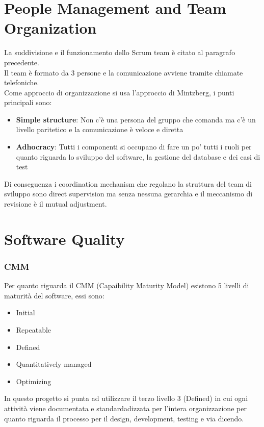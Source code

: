 \documentclass{article}
\begin{document}
\section{People Management and Team Organization}
La suddivisione e il funzionamento dello Scrum team è citato al paragrafo precedente. 
\\Il team è formato da 3 persone e la comunicazione avviene tramite chiamate telefoniche.
\\Come approccio di organizzazione si usa l'approccio di Mintzberg, i punti principali sono:
\begin{itemize}
     \item \textbf{Simple structure}: Non c'è una persona del gruppo che comanda ma c'è un livello paritetico
        e la comunicazione è veloce e diretta
    \item \textbf{Adhocracy}: Tutti i componenti si occupano di fare un po' tutti i ruoli per 
        quanto riguarda lo sviluppo del software, la gestione del database e dei casi di test  
\end{itemize}
Di conseguenza i coordination mechanism che regolano la struttura del team di sviluppo sono
direct supervision ma senza nessuna gerarchia e il meccanismo di revisione è il mutual adjustment.
   \newpage
\section{Software Quality}
\subsubsection{CMM}
Per quanto riguarda il CMM (Capaibility Maturity Model) esistono 5 livelli di maturità del software, essi sono:
\begin{itemize}
    \item Initial 
    \item Repeatable
    \item Defined
    \item Quantitatively managed
    \item Optimizing
\end{itemize}
In questo progetto si punta ad utilizzare il terzo livello 3 (Defined) in cui ogni attività viene documentata
e standardadizzata per l'intera organizzazione per quanto riguarda il  processo per il design, development, testing e via dicendo.
\end{document}

